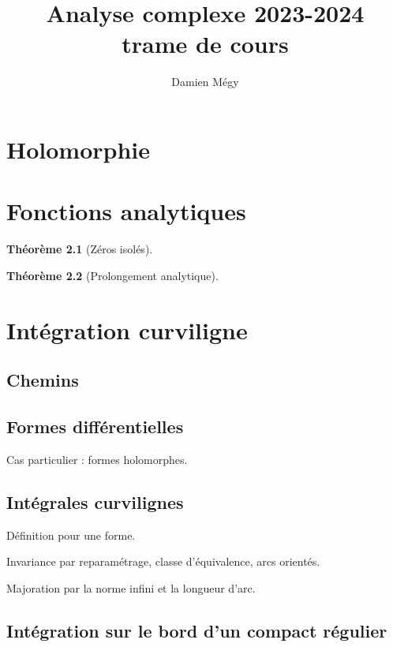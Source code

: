 \documentclass[11pt,a4paper]{book}
\title{Analyse complexe 2023-2024\\ trame de cours}
\author{Damien Mégy}
\theoremstyle{definition}
\newtheorem{theoreme}{Th\'eor\`eme}[section]
\theoremstyle{plain}
\begin{document}
\maketitle
\tableofcontents

\chapter{Holomorphie}

\chapter{Fonctions analytiques}

\begin{theoreme}[Zéros isolés]

\end{theoreme}

\begin{theoreme}[Prolongement analytique]

\end{theoreme}

\chapter{Intégration curviligne}

\section{Chemins}

\section{Formes différentielles}

Cas particulier : formes holomorphes.

\section{Intégrales curvilignes}

Définition pour une forme.

Invariance par reparamétrage, classe d'équivalence, arcs orientés.

Majoration par la norme infini et la longueur d'arc.

\section{Intégration sur le bord d'un compact régulier}
\end{document}
